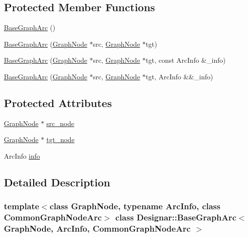 \subsection*{Protected Member Functions}
\begin{DoxyCompactItemize}
\item 
\hyperlink{class_designar_1_1_base_graph_arc_ab68bc29411653f2d8b12d3ccc5efc1e7}{Base\+Graph\+Arc} ()
\item 
\hyperlink{class_designar_1_1_base_graph_arc_a1a789ba5e3fdb980a066bb56aa258681}{Base\+Graph\+Arc} (\hyperlink{class_designar_1_1_graph_node}{Graph\+Node} $\ast$src, \hyperlink{class_designar_1_1_graph_node}{Graph\+Node} $\ast$tgt)
\item 
\hyperlink{class_designar_1_1_base_graph_arc_a013c1af0c1aadf28260b33585308f7ac}{Base\+Graph\+Arc} (\hyperlink{class_designar_1_1_graph_node}{Graph\+Node} $\ast$src, \hyperlink{class_designar_1_1_graph_node}{Graph\+Node} $\ast$tgt, const Arc\+Info \&\+\_\+info)
\item 
\hyperlink{class_designar_1_1_base_graph_arc_a150cb81ef3f2baac1abee99adae6f410}{Base\+Graph\+Arc} (\hyperlink{class_designar_1_1_graph_node}{Graph\+Node} $\ast$src, \hyperlink{class_designar_1_1_graph_node}{Graph\+Node} $\ast$tgt, Arc\+Info \&\&\+\_\+info)
\end{DoxyCompactItemize}
\subsection*{Protected Attributes}
\begin{DoxyCompactItemize}
\item 
\hyperlink{class_designar_1_1_graph_node}{Graph\+Node} $\ast$ \hyperlink{class_designar_1_1_base_graph_arc_a3d62765087127c26045bfae7a3c5f6f8}{src\+\_\+node}
\item 
\hyperlink{class_designar_1_1_graph_node}{Graph\+Node} $\ast$ \hyperlink{class_designar_1_1_base_graph_arc_af09ee39743d9a2e6f7bad479d925c273}{tgt\+\_\+node}
\item 
Arc\+Info \hyperlink{class_designar_1_1_base_graph_arc_a8aacc596a2fbca49cc927d6eaac595aa}{info}
\end{DoxyCompactItemize}


\subsection{Detailed Description}
\subsubsection*{template$<$class Graph\+Node, typename Arc\+Info, class Common\+Graph\+Node\+Arc$>$\newline
class Designar\+::\+Base\+Graph\+Arc$<$ Graph\+Node, Arc\+Info, Common\+Graph\+Node\+Arc $>$}



